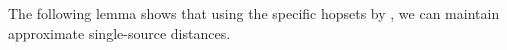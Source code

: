 \documentclass[11pt]{article}
\newtheorem{corollary}[theorem]{Corollary}
\newtheorem{lemma}[theorem]{Lemma}
\theoremstyle{definition}
\theoremstyle{remark}
\begin{document}
The following lemma shows that using the specific hopsets by \cite{LN2020}, we can maintain approximate single-source distances. 


\end{document}
